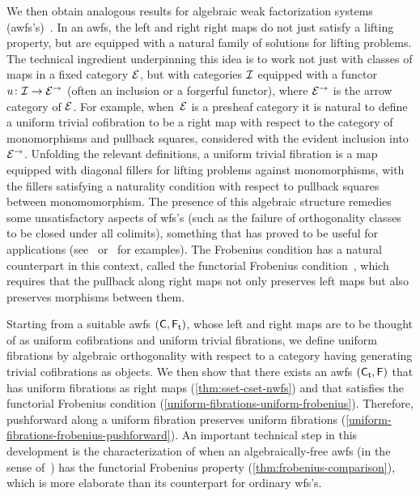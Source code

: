 \documentclass[reqno,10pt,a4paper,oneside,draft]{amsart}
\begin{document}
We then obtain analogous results for algebraic weak factorization systems (awfs's)~\cite{garner:small-object-argument,grandis-tholen-nwfs}.
In an awfs, the left and right right maps do not just satisfy a lifting property, but are equipped with a natural family of solutions for lifting problems.
The technical ingredient underpinning this idea is to work not just with classes of maps in a fixed category $\cal{E}$, but with  categories $\cal{I}$ equipped with a functor $u \co \cal{I} \to \cal{E}^\to$ (often an inclusion or a forgerful functor), where $\cal{E}^\to$ is the arrow category of $\cal{E}$.
For example, when~$\cal{E}$ is a presheaf category it is natural to define a uniform trivial cofibration to be a right map with respect to the category of monomorphisms and pullback squares, considered with the evident inclusion into $\cal{E}^\to$.
Unfolding the relevant definitions, a uniform trivial fibration is a map equipped with diagonal fillers for lifting problems against monomorphisms, with the fillers satisfying a naturality condition with respect to pullback squares between monomomorphism.
The presence of this algebraic structure remedies some unsatisfactory aspects of wfs's (such as the failure of orthogonality classes to be closed under all colimits), something that has proved to be useful for applications (see~\cite{batanin-cisinski-weber,garner:globular-operator-awfs,garner-homomorphisms} or~\cite{awodey-cubical,coquand-cubical-sets,cohen-et-al:cubicaltt,pitts-cubical-nominal,swan-awfs} for examples).
The Frobenius condition has a natural counterpart in this context, called the functorial Frobenius condition~\cite{garner:topological-simplicial}, which requires that the pullback along right maps not only preserves left maps but also preserves morphisms between them.

Starting from a suitable awfs $(\CC, \TF)$, whose left and right maps are to be thought of as uniform cofibrations and uniform trivial fibrations, we define uniform fibrations by algebraic orthogonality with respect to a category having 
generating trivial cofibrations as objects.
We then show that there exists an awfs $(\TC, \FF)$ that has uniform fibrations as right maps (\cref{thm:sset-cset-nwfs}) and that satisfies the functorial Frobenius condition (\cref{uniform-fibrations-uniform-frobenius}).
Therefore, pushforward along a uniform fibration preserves uniform fibrations (\cref{uniform-fibrations-frobenius-pushforward}).
An important technical step in this development is the characterization of when an algebraically-free awfs (in the sense of~\cite{garner:small-object-argument}) has the functorial Frobenius property (\cref{thm:frobenius-comparison}), which is more elaborate than its counterpart for ordinary wfs's.
\end{document}
